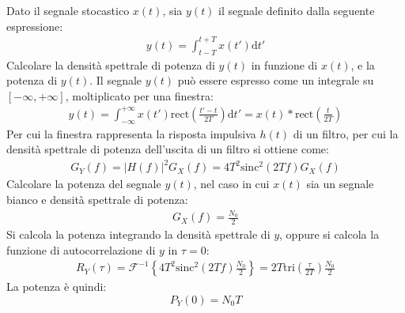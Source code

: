 \documentclass{article}
\newcommand{\rect}{\mathrm{rect}}
\newcommand{\sinc}{\mathrm{sinc}}
\newcommand{\df}{\mathrm{d}}
\begin{document}
Dato il segnale stocastico $x(t)$, sia $y(t)$ il segnale definito dalla seguente espressione:
\begin{gather*}
    y(t)=\displaystyle\int_{t-T}^{t+T}x(t')\df t'
\end{gather*}
Calcolare la densità spettrale di potenza di $y(t)$ in funzione di $x(t)$, e la potenza di $y(t)$. 
Il segnale $y(t)$ può essere espresso come un integrale su $[-\infty,+\infty]$, moltiplicato per una finestra:
\begin{gather*}
    y(t)=\displaystyle\int_{-\infty}^{+\infty}x(t')\rect\left(\frac{t'-t}{2T}\right)\df t'=x(t)*\rect\left(\frac{t}{2T}\right)
\end{gather*}
Per cui la finestra rappresenta la risposta impulsiva $h(t)$ di un filtro, per cui la densità spettrale di potenza dell'uscita di un filtro si ottiene come:
\begin{gather}
    G_Y(f)=|H(f)|^2G_X(f)=4T^2\sinc^2(2Tf)G_X(f)
\end{gather}
Calcolare la potenza del segnale $y(t)$, nel caso in cui $x(t)$ sia un segnale bianco e densità spettrale di potenza:
\begin{gather*}
    G_X(f)=\displaystyle\frac{N_0}{2}
\end{gather*}
Si calcola la potenza integrando la densità spettrale di $y$, oppure si calcola la funzione di autocorrelazione di $y$ in $\tau=0$:
\begin{gather*}
    R_Y(\tau)=\mathscr{F}^{-1}\left\{4T^2\sinc^2(2Tf)\displaystyle\frac{N_0}{2}\right\}=2T\mathrm{tri}\left(\frac{\tau}{2T}\right)\frac{N_0}{2}
\end{gather*}
La potenza è quindi:
\begin{equation}
    P_Y(0)=N_0T
\end{equation}
\end{document}
